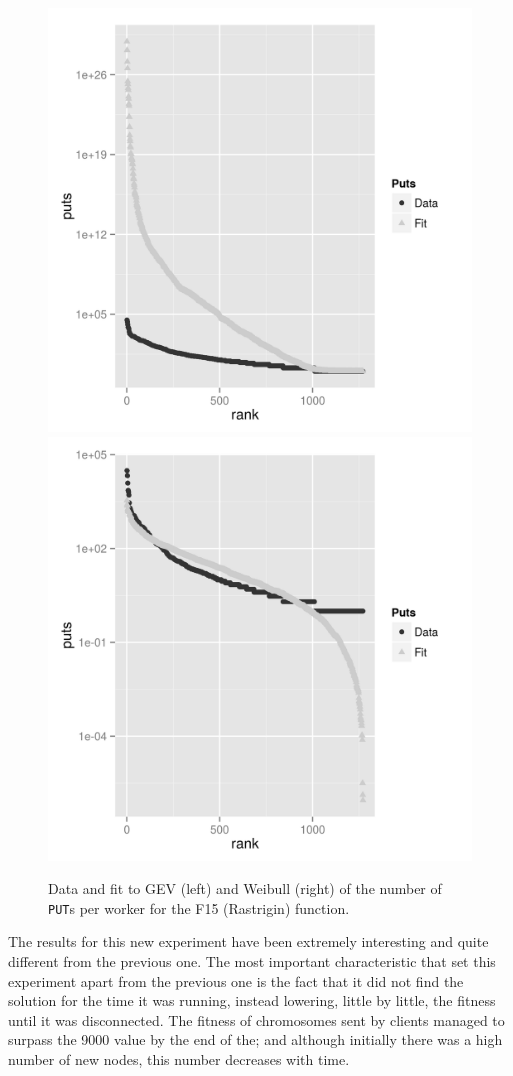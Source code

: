 \documentclass[journal,onecolumn]{IEEEtran}
\begin{document}
\begin{figure}[!htb]
\centering
\includegraphics[width=0.49\linewidth]{gev-fit-ww-rastrigin-workers.png}
\includegraphics[width=0.49\linewidth]{weibull-fit-ww-rastrigin-workers.png}
\caption{Data and fit to GEV (left) and Weibull (right) of the number
  of {\tt PUT}s per worker for the F15 (Rastrigin) function.}  
\label{fig:fit:rastrigin}
\end{figure}
%

The results for this new experiment have been extremely interesting
and quite different from the previous one. The most important
characteristic that set this experiment apart from the previous one is
the fact that it did not find the solution for the time it was
running, instead lowering, little by little, the fitness until it was
disconnected. The fitness of chromosomes sent by clients managed to
surpass the 9000 value by the end of the; and although initially there
was a high number of new nodes, this number decreases with time.
\end{document}
